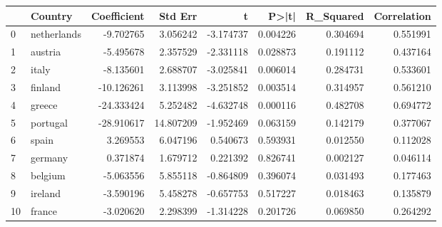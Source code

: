 \begin{tabular}{llrrrrrr}
\toprule
 & Country & Coefficient & Std Err & t & P>|t| & R_Squared & Correlation \\
\midrule
0 & netherlands & -9.702765 & 3.056242 & -3.174737 & 0.004226 & 0.304694 & 0.551991 \\
1 & austria & -5.495678 & 2.357529 & -2.331118 & 0.028873 & 0.191112 & 0.437164 \\
2 & italy & -8.135601 & 2.688707 & -3.025841 & 0.006014 & 0.284731 & 0.533601 \\
3 & finland & -10.126261 & 3.113998 & -3.251852 & 0.003514 & 0.314957 & 0.561210 \\
4 & greece & -24.333424 & 5.252482 & -4.632748 & 0.000116 & 0.482708 & 0.694772 \\
5 & portugal & -28.910617 & 14.807209 & -1.952469 & 0.063159 & 0.142179 & 0.377067 \\
6 & spain & 3.269553 & 6.047196 & 0.540673 & 0.593931 & 0.012550 & 0.112028 \\
7 & germany & 0.371874 & 1.679712 & 0.221392 & 0.826741 & 0.002127 & 0.046114 \\
8 & belgium & -5.063556 & 5.855118 & -0.864809 & 0.396074 & 0.031493 & 0.177463 \\
9 & ireland & -3.590196 & 5.458278 & -0.657753 & 0.517227 & 0.018463 & 0.135879 \\
10 & france & -3.020620 & 2.298399 & -1.314228 & 0.201726 & 0.069850 & 0.264292 \\
\bottomrule
\end{tabular}
